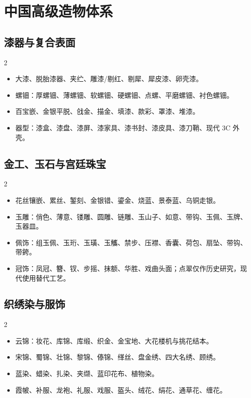 \documentclass[lang=en,a4paper,11pt]{elegantpaper}
\begin{document}
\section{中国高级造物体系}


\subsection{漆器与复合表面}


\begin{multicols}{2}
\begin{itemize}
\item 大漆、脱胎漆器、夹纻、雕漆/剔红、剔犀、犀皮漆、卵壳漆。
\item 螺钿：厚螺钿、薄螺钿、软螺钿、硬螺钿、点螺、平磨螺钿、衬色螺钿。
\item 百宝嵌、金银平脱、戗金、描金、填漆、款彩、罩漆、堆漆。
\item 器型：漆盒、漆盘、漆屏、漆家具、漆书封、漆皮具、漆刀鞘、现代 3C 外壳。
\end{itemize}
\end{multicols}

\subsection{金工、玉石与宫廷珠宝}


\begin{multicols}{2}
\begin{itemize}
\item 花丝镶嵌、累丝、錾刻、金银错、鎏金、烧蓝、景泰蓝、乌铜走银。
\item 玉雕：俏色、薄意、镂雕、圆雕、链雕、玉山子、如意、带钩、玉佩、玉牌、玉器皿。
\item 佩饰：组玉佩、玉珩、玉璜、玉觿、禁步、压襟、香囊、荷包、扇坠、带钩、带銙。
\item 冠饰：凤冠、簪、钗、步摇、抹额、华胜、戏曲头面；点翠仅作历史研究，现代使用替代工艺。
\end{itemize}
\end{multicols}

\subsection{织绣染与服饰}


\begin{multicols}{2}
\begin{itemize}
\item 云锦：妆花、库锦、库缎、织金、金宝地、大花楼机与挑花结本。
\item 宋锦、蜀锦、壮锦、黎锦、傣锦、缂丝、盘金绣、四大名绣、顾绣。
\item 蓝染、蜡染、扎染、夹缬、蓝印花布、植物染。
\item 霞帔、补服、龙袍、礼服、戏服、盔头、绒花、绢花、通草花、缠花。
\end{itemize}
\end{multicols}
\end{document}

